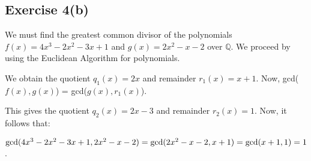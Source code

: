 \subsection*{Exercise 4(b)}
We must find the greatest common divisor of the polynomials $f(x) = 4x^3 - 2x^2 - 3x + 1$ and $g(x) = 2x^2 - x - 2$ over $\mathbb{Q}$. We proceed by using the Euclidean Algorithm for polynomials.


We obtain the quotient $q_1(x) = 2x$ and remainder $r_1(x) = x+1$. Now, gcd($f(x),g(x)$) = gcd($g(x),r_1(x)$).


This gives the quotient $q_2(x) = 2x - 3$ and remainder $r_2(x) = 1$. Now, it follows that:

$\textnormal{gcd}(4x^3 - 2x^2 - 3x + 1,2x^2 - x - 2) = \textnormal{gcd}(2x^2 - x - 2,x+1) = \textnormal{gcd}(x+1,1) = 1$.